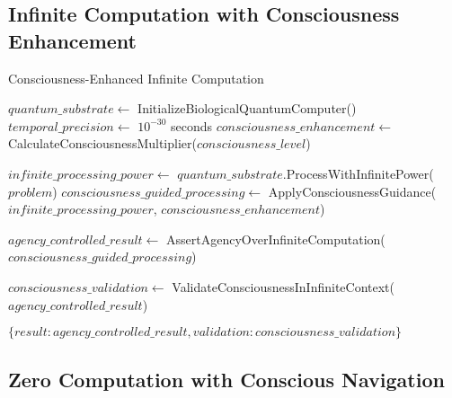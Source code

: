 \documentclass[12pt,a4paper]{article}
\begin{document}
\subsection{Infinite Computation with Consciousness Enhancement}

\begin{algorithm}
\caption{Consciousness-Enhanced Infinite Computation}
\begin{algorithmic}[1]
    \State $quantum\_substrate \gets$ InitializeBiologicalQuantumComputer()
    \State $temporal\_precision \gets$ $10^{-30}$ seconds  
    \State $consciousness\_enhancement \gets$ CalculateConsciousnessMultiplier($consciousness\_level$)
    
    \State $infinite\_processing\_power \gets$ $quantum\_substrate$.ProcessWithInfinitePower($problem$)
    \State $consciousness\_guided\_processing \gets$ ApplyConsciousnessGuidance($infinite\_processing\_power$, $consciousness\_enhancement$)
    
    \State $agency\_controlled\_result \gets$ AssertAgencyOverInfiniteComputation($consciousness\_guided\_processing$)
    
    \State $consciousness\_validation \gets$ ValidateConsciousnessInInfiniteContext($agency\_controlled\_result$)
    
    \State \Return $\{result: agency\_controlled\_result, validation: consciousness\_validation\}$
\EndProcedure
\end{algorithmic}
\end{algorithm}

\subsection{Zero Computation with Conscious Navigation}
\end{document}
